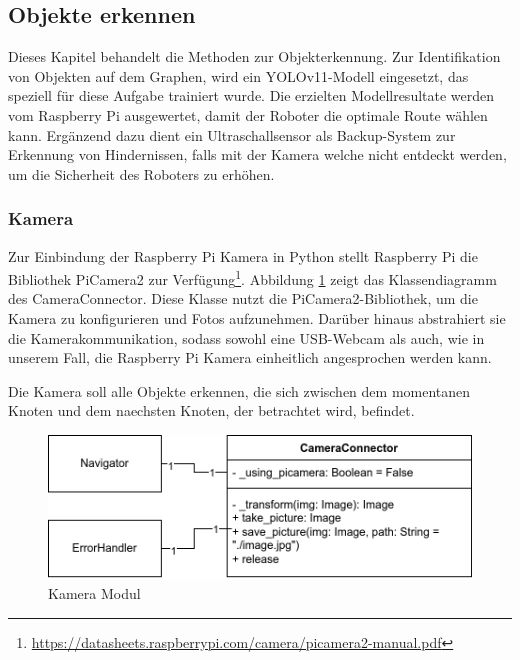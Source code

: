 
\subsection{Objekte erkennen}

Dieses Kapitel behandelt die Methoden zur Objekterkennung. Zur Identifikation von Objekten auf dem Graphen, wird ein YOLOv11-Modell eingesetzt, das speziell für diese Aufgabe trainiert wurde. Die erzielten Modellresultate werden vom Raspberry Pi ausgewertet, damit der Roboter die optimale Route wählen kann. Ergänzend dazu dient ein Ultraschallsensor als Backup-System zur Erkennung von Hindernissen, falls mit der Kamera welche nicht entdeckt werden, um die Sicherheit des Roboters zu erhöhen. 


\subsubsection{Kamera}
\label{camera-connector}

Zur Einbindung der Raspberry Pi Kamera in Python stellt Raspberry Pi die Bibliothek PiCamera2 zur Verfügung\footnote{\url{https://datasheets.raspberrypi.com/camera/picamera2-manual.pdf}}.
Abbildung \ref{fig:camera-connector-classdiagram} zeigt das Klassendiagramm des CameraConnector. Diese Klasse nutzt die PiCamera2-Bibliothek, um die Kamera zu konfigurieren und Fotos aufzunehmen. Darüber hinaus abstrahiert sie die Kamerakommunikation, sodass sowohl eine USB-Webcam als auch, wie in unserem Fall, die Raspberry Pi Kamera einheitlich angesprochen werden kann.

Die Kamera soll alle Objekte erkennen, die sich zwischen dem momentanen Knoten und dem naechsten Knoten, der betrachtet wird, befindet.

 \begin{figure}[H]
\centering
\includegraphics[width= \textwidth ]{assets/IT/robot-sw-architecture-camera-connector.png}
\caption{Kamera Modul}
\label{fig:camera-connector-classdiagram}
\end{figure}



